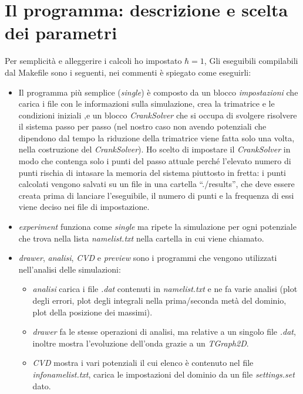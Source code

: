 \section{Il programma: descrizione e scelta dei parametri}
Per semplicit\`a e alleggerire i calcoli ho impostato $\hbar=1$, 
Gli eseguibili compilabili dal Makefile sono i seguenti, nei commenti \`e spiegato come eseguirli:

\begin{itemize}
\item Il programma pi\`u semplice (\textit{single}) \`e composto da un blocco \textit{impostazioni} che carica i file con le informazioni sulla simulazione, crea la trimatrice e le condizioni iniziali ,e un blocco \textit{CrankSolver} che si occupa di svolgere risolvere il sistema passo per passo (nel nostro caso non avendo potenziali che dipendono dal tempo la riduzione della trimatrice viene fatta solo una volta, nella costruzione del \textit{CrankSolver}).
  Ho scelto di impostare il \textit{CrankSolver} in modo che contenga solo i punti del passo attuale perch\'e l'elevato numero di punti rischia di intasare la memoria del sistema piuttosto in fretta: i punti calcolati vengono salvati su un file in una cartella ``./results'', che deve essere creata prima di lanciare l'eseguibile, il numero di punti e la frequenza di essi viene deciso nei file di impostazione.
\item \textit{experiment} funziona come \textit{single} ma ripete la simulazione per ogni potenziale che trova nella lista \textit{namelist.txt} nella cartella in cui viene chiamato.
\item \textit{drawer}, \textit{analisi}, \textit{CVD} e \textit{preview} sono i programmi che vengono utilizzati nell'analisi delle simulazioni:
  \begin{itemize}
  \item \textit{analisi} carica i file  \textit{.dat} contenuti in \textit{namelist.txt} e ne fa varie analisi (plot degli errori, plot degli integrali nella prima/seconda met\`a del dominio, plot della posizione dei massimi).
  \item \textit{drawer} fa le stesse operazioni di analisi, ma relative a un singolo file \textit{.dat}, inoltre mostra l'evoluzione dell'onda grazie a un \textit{TGraph2D}.
  \item \textit{CVD} mostra i vari potenziali il cui elenco \`e contenuto nel file \textit{infonamelist.txt}, carica le impostazioni del dominio da un file \textit{settings.set} dato.

\end{itemize}
\end{itemize}
